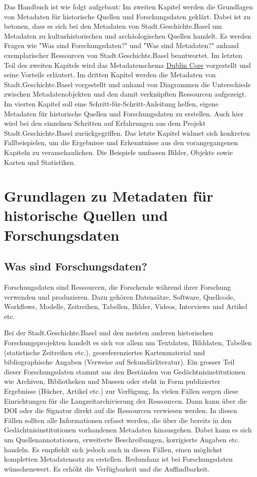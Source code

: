 \documentclass[
  letterpaper,
  DIV=11,
  numbers=noendperiod]{scrartcl}
\begin{document}
Das Handbuch ist wie folgt aufgebaut: Im zweiten Kapitel werden die
Grundlagen von Metadaten für historische Quellen und Forschungsdaten
geklärt. Dabei ist zu betonen, dass es sich bei den Metadaten von
Stadt.Geschichte.Basel um Metadaten zu kulturhistorischen und
archäologischen Quellen handelt. Es werden Fragen wie "Was sind
Forschungsdaten?" und "Was sind Metadaten?" anhand exemplarischer
Ressourcen von Stadt.Geschichte.Basel beantwortet. Im letzten Teil des
zweiten Kapitels wird das Metadatenschema
\href{https://www.dublincore.org}{Dublin Core} vorgestellt und seine
Vorteile erläutert. Im dritten Kapitel werden die Metadaten von
Stadt.Geschichte.Basel vorgestellt und anhand von Diagrammen die
Unterschiede zwischen Metadatenobjekten und den damit verknüpften
Ressourcen aufgezeigt. Im vierten Kapitel soll eine
Schritt-für-Schritt-Anleitung helfen, eigene Metadaten für historische
Quellen und Forschungsdaten zu erstellen. Auch hier wird bei den
einzelnen Schritten auf Erfahrungen aus dem Projekt
Stadt.Geschichte.Basel zurückgegriffen. Das letzte Kapitel widmet sich
konkreten Fallbeispielen, um die Ergebnisse und Erkenntnisse aus den
vorangegangenen Kapiteln zu veranschaulichen. Die Beispiele umfassen
Bilder, Objekte sowie Karten und Statistiken.

\section{Grundlagen zu Metadaten für historische Quellen und
Forschungsdaten}\label{grundlagen-zu-metadaten-fuxfcr-historische-quellen-und-forschungsdaten}

\subsection{Was sind Forschungsdaten?}\label{was-sind-forschungsdaten}

Forschungsdaten sind Ressourcen, die Forschende während ihrer Forschung
verwenden und produzieren. Dazu gehören Datensätze, Software, Quellcode,
Workflows, Modelle, Zeitreihen, Tabellen, Bilder, Videos, Interviews und
Artikel etc.

Bei der Stadt.Geschichte.Basel und den meisten anderen historischen
Forschungsprojekten handelt es sich vor allem um Textdaten, Bilddaten,
Tabellen (statistische Zeitreihen etc.), georeferenziertes
Kartenmaterial und bibliographische Angaben (Verweise auf
Sekundärliteratur). Ein grosser Teil dieser Forschungsdaten stammt aus
den Beständen von Gedächtnisinstitutionen wie Archiven, Bibliotheken und
Museen oder steht in Form publizierter Ergebnisse (Bücher, Artikel etc.)
zur Verfügung. In vielen Fällen sorgen diese Einrichtungen für die
Langzeitarchivierung der Ressourcen. Dann kann über die DOI oder die
Signatur direkt auf die Ressourcen verwiesen werden. In diesen Fällen
sollten alle Informationen erfasst werden, die über die bereits in den
Gedächtnisinstitutionen vorhandenen Metadaten hinausgehen. Dabei kann es
sich um Quellenannotationen, erweiterte Beschreibungen, korrigierte
Angaben etc. handeln. Es empfiehlt sich jedoch auch in diesen Fällen,
einen möglichst kompletten Metadatensatz zu erstellen. Redundanz ist bei
Forschungsdaten wünschenswert. Es erhöht die Verfügbarkeit und die
Auffindbarkeit.
\end{document}
